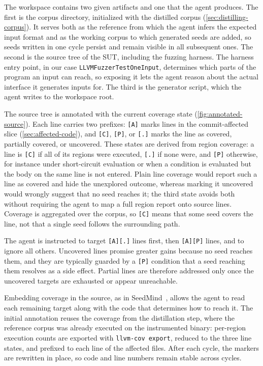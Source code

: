 The workspace contains two given artifacts and one that the agent produces.
The first is the corpus directory, initialized with the distilled corpus (\cref{sec:distilling-corpus}).
It serves both as the reference from which the agent infers the expected input format and as the working corpus to which generated seeds are added, so seeds written in one cycle persist and remain visible in all subsequent ones.
The second is the source tree of the \ac{SUT}, including the fuzzing harness.
The harness entry point, in our case \texttt{LLVMFuzzerTestOneInput}, determines which parts of the program an input can reach, so exposing it lets the agent reason about the actual interface it generates inputs for.
The third is the generator script, which the agent writes to the workspace root.



The source tree is annotated with the current coverage state (\cref{fig:annotated-source}).
Each line carries two prefixes: \texttt{[A]} marks lines in the commit-affected slice (\cref{sec:affected-code}), and \texttt{[C]}, \texttt{[P]}, or \texttt{[.]} marks the line as covered, partially covered, or uncovered.
These states are derived from region coverage: a line is \texttt{[C]} if all of its regions were executed, \texttt{[.]} if none were, and \texttt{[P]} otherwise, for instance under short-circuit evaluation or when a condition is evaluated but the body on the same line is not entered.
Plain line coverage would report such a line as covered and hide the unexplored outcome, whereas marking it uncovered would wrongly suggest that no seed reaches it; the third state avoids both without requiring the agent to map a full region report onto source lines.
Coverage is aggregated over the corpus, so \texttt{[C]} means that some seed covers the line, not that a single seed follows the surrounding path.

The agent is instructed to target \texttt{[A][.]} lines first, then \texttt{[A][P]} lines, and to ignore all others.
Uncovered lines promise greater gains because no seed reaches them, and they are typically guarded by a \texttt{[P]} condition that a seed reaching them resolves as a side effect.
Partial lines are therefore addressed only once the uncovered targets are exhausted or appear unreachable.

Embedding coverage in the source, as in SeedMind~\cite{shiHarnessingLargeLanguage2024}, allows the agent to read each remaining target along with the code that determines how to reach it.
The initial annotation reuses the coverage from the distillation step, where the reference corpus was already executed on the instrumented binary: per-region execution counts are exported with \texttt{llvm-cov export}, reduced to the three line states, and prefixed to each line of the affected files.
After each cycle, the markers are rewritten in place, so code and line numbers remain stable across cycles.


